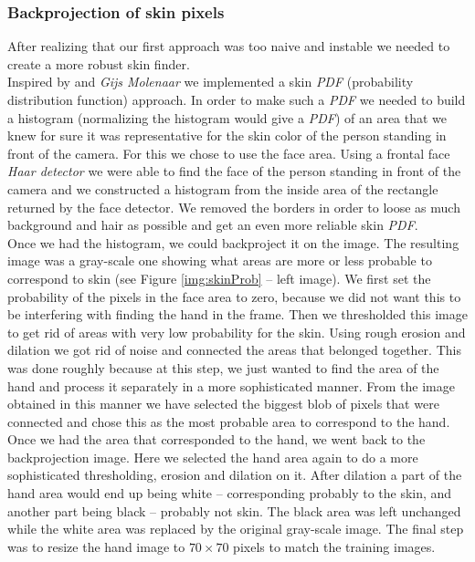 \documentclass[a4paper, 11pt, twocolumn]{article}
\begin{document}
		\subsubsection{Backprojection of skin pixels}
       	After realizing that our first approach was too naive and instable we needed to create a more robust skin finder.\\
       \hspace*{10px} Inspired by \cite{IMS} and \emph{Gijs Molenaar} we implemented a skin \emph{PDF} (probability distribution function) approach. In order to make such a \emph{PDF} we needed to build a histogram (normalizing the histogram would give a \emph{PDF}) of an area that we knew for sure it was representative for the skin color of the person standing in front of the camera. For this we chose to use the face area. Using a frontal face \emph{Haar detector} we were able to find the face of the person standing in front of the camera and we constructed a histogram from the inside area of the rectangle returned by the face detector. We removed the borders in order to loose as much background and hair as possible and get an even more reliable skin \emph{PDF}.\\
       \hspace*{10px} Once we had the histogram, we could backproject it on the image. The resulting image was a gray-scale one showing what areas are more or less probable to correspond to skin (see Figure \ref{img:skinProb} -- left image). We first set the probability of the pixels in the face area to zero, because we did not want this to be interfering with finding the hand in the frame. Then we thresholded this image to get rid of areas with very low probability for the skin. Using rough erosion and dilation we got rid of noise and connected the areas that belonged together. This was done roughly because at this step, we just wanted to find the area of the hand and process it separately in a more sophisticated manner. From the image obtained in this manner we have selected the biggest blob of pixels that were connected and chose this as the most probable area to correspond to the hand.\\
       \hspace*{10px}Once we had the area that corresponded to the hand, we went back to the backprojection image. Here we selected the hand area again to do a more sophisticated thresholding, erosion and dilation on it. After dilation a part of the hand area would end up being white -- corresponding probably to the skin, and another part being black -- probably not skin. The black area was left unchanged while the white area was replaced by the original gray-scale image. The final step was to resize the hand image to \emph{$70\times 70$} pixels to match the training images.\\
\end{document}
